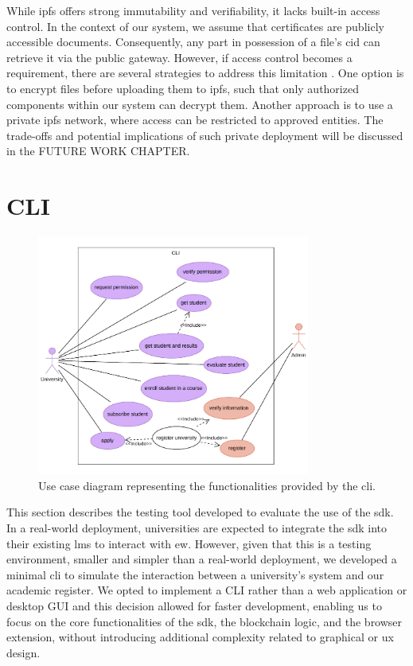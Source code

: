While \acrshort{ipfs} offers strong immutability and verifiability, it lacks built-in access control. In the context of our system, we assume that certificates are publicly accessible documents. Consequently, any part in possession of a file's \acrshort{cid} can retrieve it via the public gateway. However, if access control becomes a requirement, there are several strategies to address this limitation \cite{barbaraanrealaura2021datapersistence}. One option is to encrypt files before uploading them to \acrshort{ipfs}, such that only authorized components within our system can decrypt them. Another approach is to use a private \acrshort{ipfs} network, where access can be restricted to approved entities. The trade-offs and potential implications of such private deployment will be discussed in the FUTURE WORK CHAPTER.

\section{CLI}
\label{sec:cliDesign}
\begin{figure}
  \centering
  \includegraphics[width=0.8\textwidth]{figures/CLI use case diagram.pdf}
  \caption[\acrshort{cli} use case diagram]{Use case diagram representing the functionalities provided by the \acrshort{cli}.}
  \label{fig:useCaseCli}
\end{figure}
This section describes the testing tool developed to evaluate the use of the \acrshort{sdk}. In a real-world deployment, universities are expected to integrate the \acrshort{sdk} into their existing \acrshort{lms} to interact with \acrlong{ew}. However, given that this is a testing environment, smaller and simpler than a real-world deployment, we developed a minimal \acrlong{cli} to simulate the interaction between a university's system and our academic register. We opted to implement a CLI rather than a web application or desktop GUI and this decision allowed for faster development, enabling us to focus on the core functionalities of the \acrshort{sdk}, the blockchain logic, and the browser extension, without introducing additional complexity related to graphical or \acrfull{ux} design.

